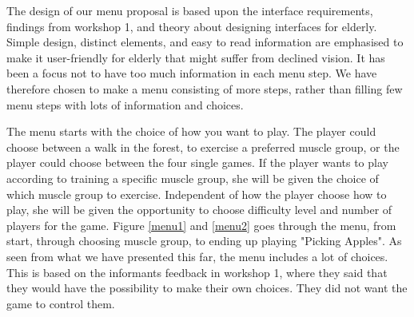 The design of our menu proposal is based upon the interface requirements, findings from workshop 1, and theory about designing interfaces for elderly. Simple design, distinct elements, and easy to read information are emphasised to make it user-friendly for elderly that might suffer from declined vision. It has been a focus not to have too much information in each menu step. We have therefore chosen to make a menu consisting of more steps, rather than filling few menu steps with lots of information and choices.   

The menu starts with the choice of how you want to play. The player could choose between a walk in the forest, to exercise a preferred muscle group, or the player could choose between the four single games. If the player wants to play according to training a specific muscle group, she will be given the choice of which muscle group to exercise. Independent of how the player choose how to play, she will be given the opportunity to choose difficulty level and number of players for the game. Figure \ref{menu1} and \ref{menu2} goes through the menu, from start, through choosing muscle group, to ending up playing "Picking Apples". As seen from what we have presented this far, the menu includes a lot of choices. This is based on the informants feedback in workshop 1, where they said that they would have the possibility to make their own choices. They did not want the game to control them.   

